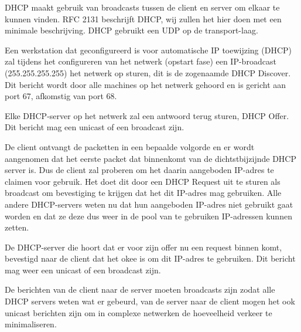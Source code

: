 DHCP maakt gebruik van broadcasts tussen de client en server om elkaar te kunnen vinden. RFC 2131 beschrijft DHCP, wij zullen het hier doen met een minimale beschrijving. DHCP gebruikt een UDP op de transport-laag.

Een werkstation dat geconfigureerd is voor automatische IP toewijzing (DHCP) zal tijdens het configureren van het netwerk (opstart fase) een IP-broadcast (255.255.255.255) het netwerk op sturen, dit is de zogenaamde DHCP Discover. Dit bericht wordt door alle machines op het netwerk gehoord en is gericht aan port 67, afkomstig van port 68.

Elke DHCP-server op het netwerk zal een antwoord terug sturen, DHCP Offer. Dit bericht mag een unicast of een broadcast zijn.

De client ontvangt de packetten in een bepaalde volgorde en er wordt aangenomen dat het eerste packet dat binnenkomt van de dichtstbijzijnde DHCP server is. Dus de client zal proberen om het daarin aangeboden IP-adres te claimen voor gebruik. Het doet dit door een DHCP Request uit te sturen als broadcast om bevestiging te krijgen dat het dit IP-adres mag gebruiken. Alle andere DHCP-servers weten nu dat hun aangeboden IP-adres niet gebruikt gaat worden en dat ze deze dus weer in de pool van te gebruiken IP-adressen kunnen zetten.

De DHCP-server die hoort dat er voor zijn offer nu een request binnen komt, bevestigd naar de client dat het okee is om dit IP-adres te gebruiken. Dit bericht mag weer een unicast of een broadcast zijn.

De berichten van de client naar de server moeten broadcasts zijn zodat alle DHCP servers weten wat er gebeurd, van de server naar de client mogen het ook unicast berichten zijn om in complexe netwerken de hoeveelheid verkeer te minimaliseren.

